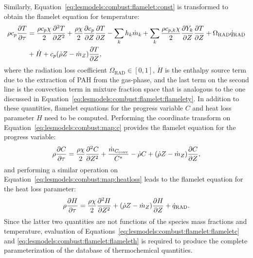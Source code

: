 Similarly, Equation~\ref{eq:lesmodels:combust:flamelet:const} is transformed to obtain the flamelet equation for temperature:
\begin{equation}\label{eq:lesmodels:combust:flamelet:flamelett}
  \begin{split}
    \rho c_p \pder[T]{\tau} &= \frac{\rho c_p \chi}{2}\sder[T]{Z} + \frac{\rho\chi}{2}\pder[c_p]{Z}\pder[T]{Z} - \sum\limits_{k} h_k\dot{m}_k + \sum\limits_{k} \frac{\rho c_{p,k}\chi}{2}\pder[Y_k]{Z}\pder[T]{Z} + \Omega_{\text{RAD}}\dot{q}_{\text{RAD}} \\
    &+ \dot{H} + c_p(\dot{\rho}Z - \dot{m}_Z)\pder[T]{Z},
  \end{split}
\end{equation}
where the radiation loss coefficient $\Omega_{\text{RAD}} \in [0,1]$, $\dot{H}$ is the enthalpy source term due to the extraction of PAH from the gas-phase, and the last term on the second line is the convection term in mixture fraction space that is analogous to the one discussed in Equation~\ref{eq:lesmodels:combust:flamelet:flamelety}. In addition to these quantities, flamelet equations for the progress variable $C$ and heat loss parameter $H$ need to be computed. Performing the coordinate transform on Equation~\ref{eq:lesmodels:combust:map:c} provides the flamelet equation for the progress variable:
\begin{equation}\label{eq:lesmodels:combust:flamelet:flameletc}
  \rho\pder[C]{\tau} = \frac{\rho\chi}{2}\sder[C]{Z} + \frac{\dot{m}_{C_{\text{conv}}}}{C^*} - \dot{\rho}C + (\dot{\rho}Z - \dot{m}_Z)\pder[C]{Z},
\end{equation}
and performing a similar operation on Equation~\ref{eq:lesmodels:combust:map:heatloss} leads to the flamelet equation for the heat loss parameter:
\begin{equation}\label{eq:lesmodels:combust:flamelet:flameleth}
  \rho\pder[H]{\tau} = \frac{\rho\chi}{2}\sder[H]{Z} + (\dot{\rho}Z - \dot{m}_Z)\pder[H]{Z} + \dot{q}_{\text{RAD}}.
\end{equation}
Since the latter two quantities are not functions of the species mass fractions and temperature, evaluation of Equations~\ref{eq:lesmodels:combust:flamelet:flameletc} and \ref{eq:lesmodels:combust:flamelet:flameleth} is required to produce the complete parameterization of the database of thermochemical quantities.


